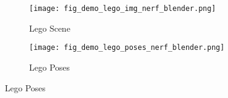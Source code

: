 \begin{figure}[H]
    \centering
    \begin{subfigure}{0.48\linewidth}
        \texttt{[image: fig\_demo\_lego\_img\_nerf\_blender.png]}
        \caption{Lego Scene}
    \end{subfigure}
    \begin{subfigure}{0.48\linewidth}
        \texttt{[image: fig\_demo\_lego\_poses\_nerf\_blender.png]}
        \caption{Lego Poses}
    \end{subfigure}
    \label{fig:dataset_nerf_blender_lego}
\end{figure}
